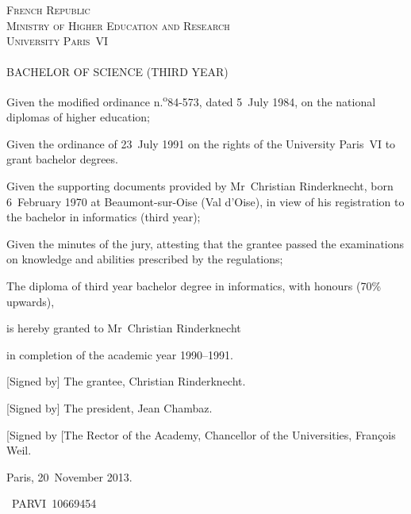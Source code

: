 \documentclass[a4paper,11pt,twoside]{article}
\begin{document}
\begin{center}
\textsc{French Republic}\\
\textsc{Ministry of Higher Education and Research}\\
\textsc{University Paris~VI}\\
\ \\
\textsc{\Large BACHELOR OF SCIENCE (THIRD YEAR)}
\end{center}

\bigskip

Given the modified ordinance n.\kern-0.5bp\textsuperscript{o}84-573,
dated 5~July 1984, on the national diplomas of higher education;

\bigskip

Given the ordinance of 23~July 1991 on the rights of the University
Paris~VI to grant bachelor degrees.

\bigskip

Given the supporting documents provided by Mr~Christian Rinderknecht,
born 6~February 1970 at Beaumont-sur-Oise (Val d'Oise), in view of his
registration to the bachelor in informatics (third year);

\bigskip

Given the minutes of the jury, attesting that the grantee passed the
examinations on knowledge and abilities prescribed by the regulations;

\bigskip

The diploma of third year bachelor degree in informatics, with honours
(70\% upwards),

\medskip

is hereby granted to Mr~Christian Rinderknecht

\medskip

in completion of the academic year 1990--1991.

\bigskip

[Signed by] The grantee, Christian Rinderknecht.

[Signed by] The president, Jean Chambaz.

[Signed by [The Rector of the Academy, Chancellor of the Universities,
    François Weil.

\bigskip

Paris, 20~November 2013.

\bigskip

\textnumero~PARVI~10669454 

\thispagestyle{empty}
\end{document}
